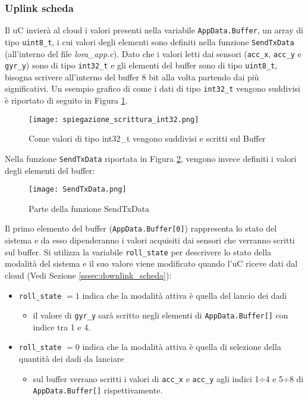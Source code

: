   \subsubsection{Uplink scheda}\label{sssec:uplink_scheda}
  Il uC invierà al cloud i valori presenti nella variabile \Verb|AppData.Buffer|, un array di tipo \Verb|uint8_t|, i cui valori degli elementi sono definiti nella funzione \Verb|SendTxData| (all'interno del file \textit{lora\_app.c}).
  Dato che i valori letti dai sensori (\Verb|acc_x|, \Verb|acc_y| e \Verb|gyr_y|) sono di tipo \Verb|int32_t| e gli elementi del buffer sono di tipo \Verb|uint8_t|, bisogna scrivere all'interno del buffer 8 bit alla volta partendo dai più significativi. Un esempio grafico di come i dati di tipo \Verb|int32_t| vengono suddivisi è riportato di seguito in Figura \ref{fig:int32tobuffer}.
  \begin{figure}[H]
    \centering
    \texttt{[image: spiegazione\_scrittura\_int32.png]}
    \caption{Come valori di tipo int32\_t vengono suddivisi e scritti sul Buffer}
    \label{fig:int32tobuffer}
  \end{figure}
  Nella funzione \Verb|SendTxData| riportata in Figura \ref{fig:sendtxdata}, vengono invece definiti i valori degli elementi del buffer:\\
\begin{figure}[H]
  \centering
  \texttt{[image: SendTxData.png]}
  \caption{Parte della funzione SendTxData}
  \label{fig:sendtxdata}
\end{figure}
Il primo elemento del buffer (\Verb|AppData.Buffer[0]|) rappresenta lo stato del sistema e da esso dipenderanno i valori acquisiti dai sensori che verranno scritti sul buffer.
  Si utilizza la variabile \Verb|roll_state| per descrivere lo stato della modalità del sistema e il suo valore viene modificato quando l'uC riceve dati dal cloud (Vedi Sezione \ref{sssec:downlink_scheda}):
  \begin{itemize}
    \item \Verb|roll_state| $=1$ indica che la modalità attiva è quella del lancio dei dadi
          \begin{itemize}
            \item il valore di \Verb|gyr_y| sarà scritto negli elementi di \Verb|AppData.Buffer[]| con indice tra 1 e 4.
          \end{itemize}
    \item \Verb|roll_state| $=0$ indica che la modalità attiva è quella di selezione della quantità dei dadi da lanciare
          \begin{itemize}
            \item sul buffer verrano scritti i valori di \Verb|acc_x| e \Verb|acc_y| agli indici 1$\div$4 e 5$\div$8 di \Verb|AppData.Buffer[]| rispettivamente.
          \end{itemize}
  \end{itemize}

